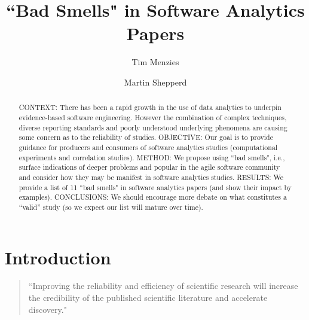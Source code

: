 \documentclass[preprint,10pt]{elsarticle}
\begin{document}
\begin{frontmatter}

\title{``Bad Smells" in Software Analytics Papers}
\author{Tim Menzies}
\address{Dept.\ of Computer Science\\North Carolina State University, USA}
\author{Martin Shepperd}
\address{Brunel Software Engineering Lab (BSEL)\\Dept.\ of Computer Science\\Brunel University London\\ UB8 3PH, UK}


\begin{abstract}
CONTEXT: There has been a rapid growth in the use of data analytics to underpin evidence-based software engineering.  However the combination of complex techniques, diverse reporting standards and poorly understood underlying phenomena are causing some concern as to the reliability of studies.\newline
OBJECTIVE: Our goal is to provide guidance for producers and consumers of software analytics studies (computational experiments and correlation studies).\newline
METHOD: We propose using ``bad smells", i.e., surface indications of deeper problems and popular in the agile software community and consider how they may be manifest in software analytics studies.\newline
RESULTS: We provide a list of 11 ``bad smells" in software analytics papers (and show their impact by examples).\newline
CONCLUSIONS: We should encourage more debate on what constitutes a ``valid'' study (so we expect our list will mature over time).
\end{abstract}

\end{frontmatter}

\maketitle

\section{Introduction}

\begin{quote}
``Improving the reliability and efficiency of scientific research will increase the credibility of the published scientific literature and accelerate discovery."  \cite{Muna17}
\end{quote}
\end{document}
